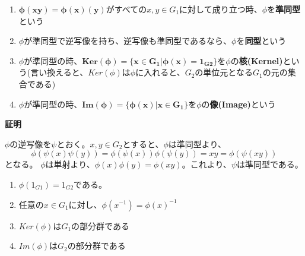 \documentclass[dvipdfmx,autodetect-engine]{jsarticle}
\begin{document}
\begin{enumerate}
\renewcommand{\labelenumi}{(\arabic{enumi})}
\item $\boldsymbol{\phi(xy) = \phi(x)(y)}$がすべての$x, y \in G_1$に対して成り立つ時、$\phi$を{\bf 準同型}という
\item $\phi$が準同型で逆写像を持ち、逆写像も準同型であるなら、$\phi$を{\bf 同型}という
\item $\phi$が準同型の時、$\boldsymbol{Ker(\phi) = \{x \in G_1 | \phi(x) = 1_{G2}}\}$を$\phi$の{\bf 核(Kernel)}という(言い換えると、$Ker(\phi)$は$\phi$に入れると、$G_2$の単位元となる$G_1$の元の集合である)
\item $\phi$が準同型の時、$\boldsymbol{Im(\phi) = \{\phi(x) | x \in G_1\}}$を$\phi$の{\bf 像(Image)}という
\end{enumerate}

\label{prop:isomorphic}

{\bf 証明}

$\phi$の逆写像を$\psi$とおく。$x, y \in G_2$とすると、$\phi$は準同型より、
$$
\phi(\psi(x)\psi(y)) = \phi(\psi(x))\phi(\psi(y)) = xy = \phi(\psi(xy))
$$
となる。
$\phi$は単射より、$\phi(x)\phi(y) = \phi(xy)$。これより、$\psi$は準同型である。


\label{prop:homomorphism}

\begin{enumerate}
\renewcommand{\labelenumi}{(\arabic{enumi})}
\item $\phi(1_{G1}) = 1_{G2}$である。
\item 任意の$x \in G_1$に対し、$\phi(x^{-1}) = \phi(x)^{-1}$
\item $Ker(\phi)$は$G_1$の部分群である
\item $Im(\phi)$は$G_2$の部分群である
\end{enumerate}
\end{document}
